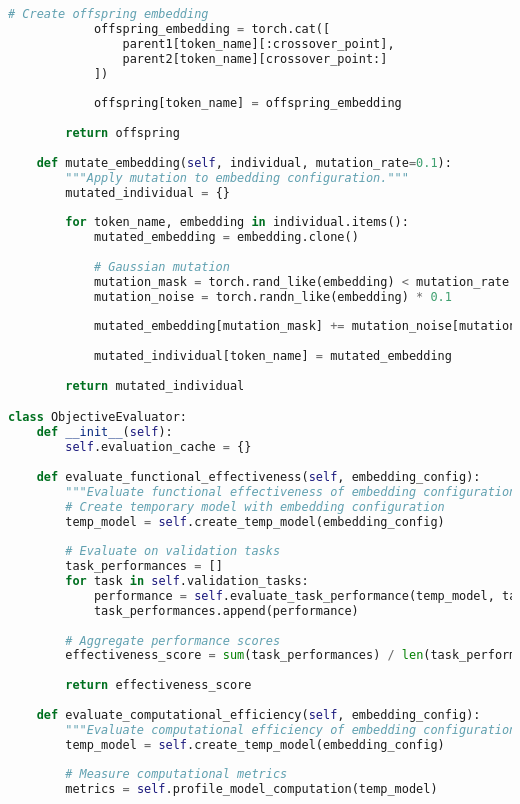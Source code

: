 \begin{lstlisting}[language=Python, caption=Multi-objective embedding optimization]
            # Create offspring embedding
            offspring_embedding = torch.cat([
                parent1[token_name][:crossover_point],
                parent2[token_name][crossover_point:]
            ])
            
            offspring[token_name] = offspring_embedding
        
        return offspring
    
    def mutate_embedding(self, individual, mutation_rate=0.1):
        """Apply mutation to embedding configuration."""
        mutated_individual = {}
        
        for token_name, embedding in individual.items():
            mutated_embedding = embedding.clone()
            
            # Gaussian mutation
            mutation_mask = torch.rand_like(embedding) < mutation_rate
            mutation_noise = torch.randn_like(embedding) * 0.1
            
            mutated_embedding[mutation_mask] += mutation_noise[mutation_mask]
            
            mutated_individual[token_name] = mutated_embedding
        
        return mutated_individual

class ObjectiveEvaluator:
    def __init__(self):
        self.evaluation_cache = {}
        
    def evaluate_functional_effectiveness(self, embedding_config):
        """Evaluate functional effectiveness of embedding configuration."""
        # Create temporary model with embedding configuration
        temp_model = self.create_temp_model(embedding_config)
        
        # Evaluate on validation tasks
        task_performances = []
        for task in self.validation_tasks:
            performance = self.evaluate_task_performance(temp_model, task)
            task_performances.append(performance)
        
        # Aggregate performance scores
        effectiveness_score = sum(task_performances) / len(task_performances)
        
        return effectiveness_score
    
    def evaluate_computational_efficiency(self, embedding_config):
        """Evaluate computational efficiency of embedding configuration."""
        temp_model = self.create_temp_model(embedding_config)
        
        # Measure computational metrics
        metrics = self.profile_model_computation(temp_model)
        

\end{lstlisting}
